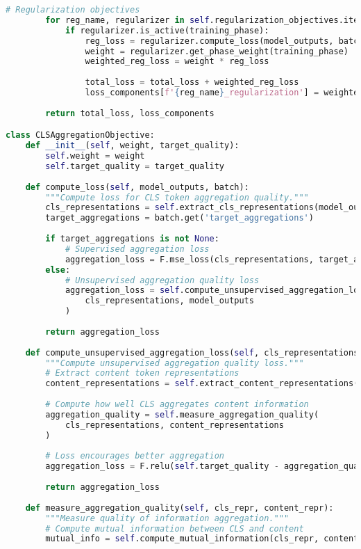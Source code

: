 \begin{lstlisting}[language=Python, caption=Progressive curriculum framework for special token pretraining]
        # Regularization objectives
        for reg_name, regularizer in self.regularization_objectives.items():
            if regularizer.is_active(training_phase):
                reg_loss = regularizer.compute_loss(model_outputs, batch)
                weight = regularizer.get_phase_weight(training_phase)
                weighted_reg_loss = weight * reg_loss
                
                total_loss = total_loss + weighted_reg_loss
                loss_components[f'{reg_name}_regularization'] = weighted_reg_loss
        
        return total_loss, loss_components

class CLSAggregationObjective:
    def __init__(self, weight, target_quality):
        self.weight = weight
        self.target_quality = target_quality
        
    def compute_loss(self, model_outputs, batch):
        """Compute loss for CLS token aggregation quality."""
        cls_representations = self.extract_cls_representations(model_outputs)
        target_aggregations = batch.get('target_aggregations')
        
        if target_aggregations is not None:
            # Supervised aggregation loss
            aggregation_loss = F.mse_loss(cls_representations, target_aggregations)
        else:
            # Unsupervised aggregation quality loss
            aggregation_loss = self.compute_unsupervised_aggregation_loss(
                cls_representations, model_outputs
            )
        
        return aggregation_loss
    
    def compute_unsupervised_aggregation_loss(self, cls_representations, model_outputs):
        """Compute unsupervised aggregation quality loss."""
        # Extract content token representations
        content_representations = self.extract_content_representations(model_outputs)
        
        # Compute how well CLS aggregates content information
        aggregation_quality = self.measure_aggregation_quality(
            cls_representations, content_representations
        )
        
        # Loss encourages better aggregation
        aggregation_loss = F.relu(self.target_quality - aggregation_quality).mean()
        
        return aggregation_loss
    
    def measure_aggregation_quality(self, cls_repr, content_repr):
        """Measure quality of information aggregation."""
        # Compute mutual information between CLS and content
        mutual_info = self.compute_mutual_information(cls_repr, content_repr)
        

\end{lstlisting}
